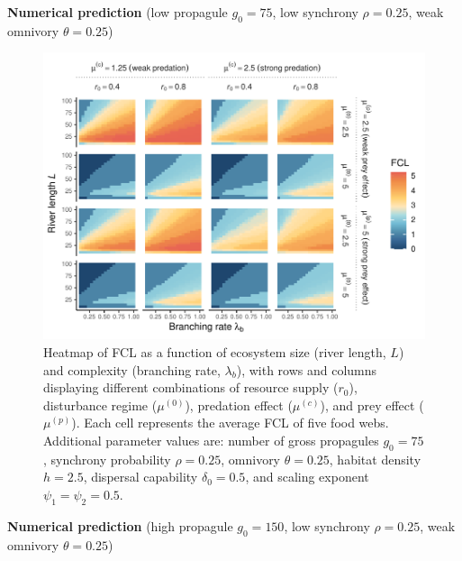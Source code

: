 \textbf{Numerical prediction} (low propagule \(g_0 = 75\), low synchrony
\(\rho = 0.25\), weak omnivory \(\theta = 0.25\))

\begin{figure}
\centering
\includegraphics{../data_fmt/fig_rho025_g75_theta025.pdf}
\caption{Heatmap of FCL as a function of ecosystem size (river length,
\(L\)) and complexity (branching rate, \(\lambda_b\)), with rows and
columns displaying different combinations of resource supply (\(r_0\)),
disturbance regime (\(\mu^{(0)}\)), predation effect (\(\mu^{(c)}\)),
and prey effect (\(\mu^{(p)}\)). Each cell represents the average FCL of
five food webs. Additional parameter values are: number of gross
propagules \(g_0=75\), synchrony probability \(\rho=0.25\), omnivory
\(\theta=0.25\), habitat density \(h=2.5\), dispersal capability
\(\delta_0=0.5\), and scaling exponent \(\psi_1=\psi_2=0.5\).}
\end{figure}

\newpage

\textbf{Numerical prediction} (high propagule \(g_0 = 150\), low
synchrony \(\rho = 0.25\), weak omnivory \(\theta = 0.25\))

